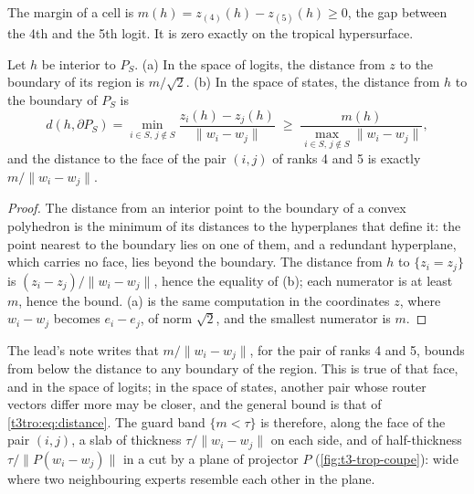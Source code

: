 \begin{definition}[Margin]\label{t3tro:def:marge}
The margin of a cell is $m(h) = z_{(4)}(h) - z_{(5)}(h) \ge 0$, the gap between the 4th and the 5th logit. It is zero exactly on the tropical hypersurface.
\end{definition}

\begin{proposition}\label{t3tro:prop:distance}
Let $h$ be interior to $P_S$. (a) In the space of logits, the distance from $z$ to the boundary of its region is $m/\sqrt 2$. (b) In the space of states, the distance from $h$ to the boundary of $P_S$ is
\begin{equation}\label{t3tro:eq:distance}
d(h, \partial P_S) = \min_{i \in S,\, j \notin S} \frac{z_i(h) - z_j(h)}{\lVert w_i - w_j \rVert} \;\ge\; \frac{m(h)}{\max_{i \in S,\, j\notin S} \lVert w_i - w_j\rVert},
\end{equation}
and the distance to the face of the pair $(i, j)$ of ranks 4 and 5 is exactly $m/\lVert w_i - w_j \rVert$.
\end{proposition}
\begin{proof}
The distance from an interior point to the boundary of a convex polyhedron is the minimum of its distances to the hyperplanes that define it: the point nearest to the boundary lies on one of them, and a redundant hyperplane, which carries no face, lies beyond the boundary. The distance from $h$ to $\{z_i = z_j\}$ is $(z_i - z_j)/\lVert w_i - w_j\rVert$, hence the equality of (b); each numerator is at least $m$, hence the bound. (a) is the same computation in the coordinates $z$, where $w_i - w_j$ becomes $e_i - e_j$, of norm $\sqrt 2$, and the smallest numerator is $m$.
\end{proof}
The lead's note writes that $m/\lVert w_i - w_j\rVert$, for the pair of ranks 4 and 5, bounds from below the distance to any boundary of the region. This is true of that face, and in the space of logits; in the space of states, another pair whose router vectors differ more may be closer, and the general bound is that of \eqref{t3tro:eq:distance}. The guard band $\{m < \tau\}$ is therefore, along the face of the pair $(i, j)$, a slab of thickness $\tau/\lVert w_i - w_j\rVert$ on each side, and of half-thickness $\tau/\lVert P(w_i - w_j)\rVert$ in a cut by a plane of projector $P$ (\cref{fig:t3-trop-coupe}): wide where two neighbouring experts resemble each other in the plane.

